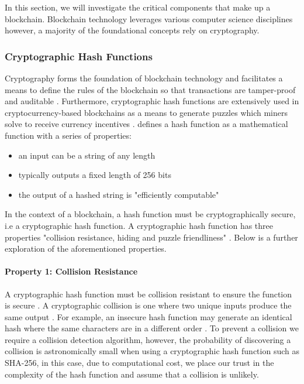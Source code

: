 In this section, we will investigate the critical components that make up a blockchain. Blockchain technology leverages various computer science disciplines however, a majority of the foundational concepts rely on cryptography. 

\subsubsection{Cryptographic Hash Functions}

Cryptography forms the foundation of blockchain technology and facilitates a means to define the rules of the blockchain so that transactions are tamper-proof and auditable \autocite{narayananBitcoinCryptocurrencyTechnologies2016}. Furthermore, cryptographic hash functions are extensively used in cryptocurrency-based blockchains as a means to generate puzzles which miners solve to receive currency incentives \autocite{yagaBlockchainTechnologyOverview2018}. \autocite{narayananBitcoinCryptocurrencyTechnologies2016} defines a hash function as a mathematical function with a series of properties:

\begin{itemize}
    \item an input can be a string of any length
    \item typically outputs a fixed length of 256 bits 
    \item the output of a hashed string is "efficiently computable"
\end{itemize}

In the context of a blockchain, a hash function must be cryptographically secure, i.e a cryptographic hash function. A cryptographic hash function has three properties "collision resistance, hiding and puzzle friendliness" \autocite{narayananBitcoinCryptocurrencyTechnologies2016}. Below is a further exploration of the aforementioned properties.

\paragraph{Property 1: Collision Resistance}

A cryptographic hash function must be collision resistant to ensure the function is secure \autocite{dipierroWhatBlockchain2017}. A cryptographic collision is one where two unique inputs produce the same output \autocite{narayananBitcoinCryptocurrencyTechnologies2016}. For example, an insecure hash function may generate an identical hash where the same characters are in a different order \autocite{nakovPracticalCryptographyDevelopers2018}. To prevent a collision we require a collision detection algorithm, however, the probability of discovering a collision is astronomically small when using a cryptographic hash function such as SHA-256, in this case, due to computational cost, we place our trust in the complexity of the hash function and assume that a collision is unlikely.

